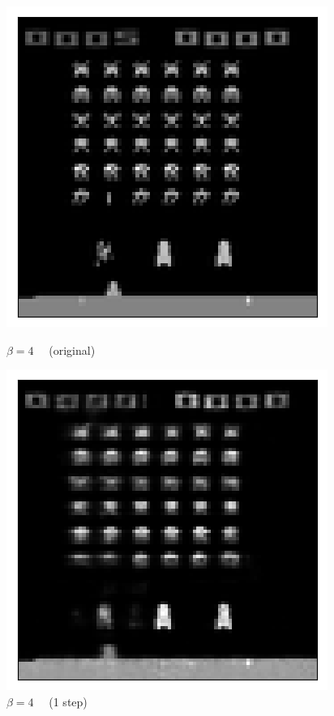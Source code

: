 \begin{figure}[h!]
\begin{multicols}{4}
    \includegraphics[scale=0.4]{figures/results/indiscriminate_decoupling/beta_2_posterior_sample_original.png}
    \caption{$\beta=4\quad$ (original)}
    \includegraphics[scale=0.4]{figures/results/indiscriminate_decoupling/beta_4_posterior_sample_0.png}
    \caption{$\beta=4\quad$ (1 step)}

\end{multicols}
\end{figure}
